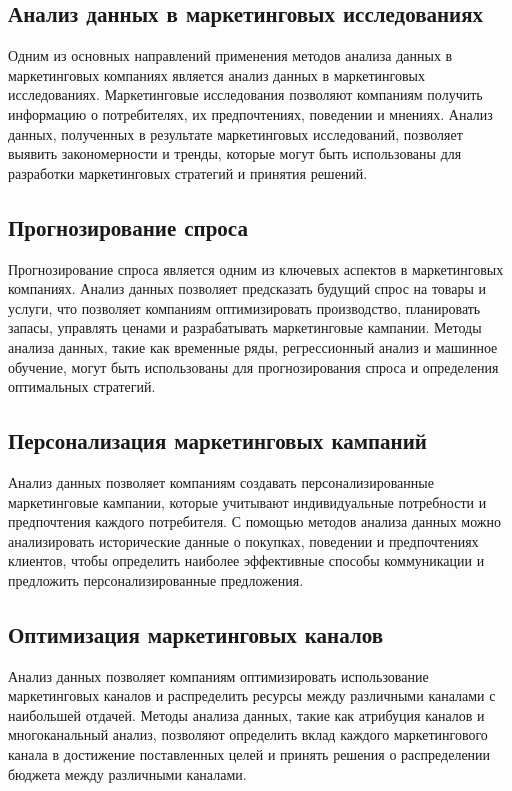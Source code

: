 \documentclass{article}
\begin{document}
\subsection{Анализ данных в маркетинговых исследованиях}
Одним из основных направлений применения методов анализа данных в маркетинговых компаниях является анализ данных в маркетинговых исследованиях. Маркетинговые исследования позволяют компаниям получить информацию о потребителях, их предпочтениях, поведении и мнениях. Анализ данных, полученных в результате маркетинговых исследований, позволяет выявить закономерности и тренды, которые могут быть использованы для разработки маркетинговых стратегий и принятия решений.
\subsection{Прогнозирование спроса}
Прогнозирование спроса является одним из ключевых аспектов в маркетинговых компаниях. Анализ данных позволяет предсказать будущий спрос на товары и услуги, что позволяет компаниям оптимизировать производство, планировать запасы, управлять ценами и разрабатывать маркетинговые кампании. Методы анализа данных, такие как временные ряды, регрессионный анализ и машинное обучение, могут быть использованы для прогнозирования спроса и определения оптимальных стратегий.
\subsection{Персонализация маркетинговых кампаний}
Анализ данных позволяет компаниям создавать персонализированные маркетинговые кампании, которые учитывают индивидуальные потребности и предпочтения каждого потребителя. С помощью методов анализа данных можно анализировать исторические данные о покупках, поведении и предпочтениях клиентов, чтобы определить наиболее эффективные способы коммуникации и предложить персонализированные предложения.
\subsection{Оптимизация маркетинговых каналов}
Анализ данных позволяет компаниям оптимизировать использование маркетинговых каналов и распределить ресурсы между различными каналами с наибольшей отдачей. Методы анализа данных, такие как атрибуция каналов и многоканальный анализ, позволяют определить вклад каждого маркетингового канала в достижение поставленных целей и принять решения о распределении бюджета между различными каналами.
\end{document}
